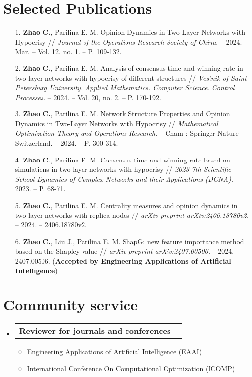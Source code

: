 \documentclass[letterpaper,10pt]{article}
\makeatletter
\newcommand{\resumeItem}[1]{
  \item\small{
    {#1 \vspace{-2pt}}
  }
}
\newcommand{\resumeProjectHeading}[2]{
  \item
  \begin{tabular*}{0.97\textwidth}{l@{\extracolsep{\fill}}r}
    \small#1 & #2 \\
  \end{tabular*}\vspace{-7pt}
}
\newenvironment{resumeSubHeadingList}{\begin{itemize}[leftmargin=0.15in, label={}]}{\end{itemize}}
\newenvironment{resumeItemList}{\begin{itemize}}{\end{itemize}}
\makeatother
\begin{document}
\section{Selected Publications}
\begin{enumerate}
    \fontsize{10}{10.5}\selectfont
    \item [1.] \textbf{Zhao C.}, Parilina E. M. Opinion Dynamics in Two-Layer Networks with Hypocrisy // {\it Journal of the Operations Research Society of China}. -- 2024. -- Mar. -- Vol. 12, no. 1. -- P. 109-132.
    \item [2.] \textbf{Zhao C.}, Parilina E. M. Analysis of consensus time and winning rate in two-layer networks with hypocrisy of different structures // {\it Vestnik of Saint Petersburg University. Applied Mathematics. Computer Science. Control Processes.} -- 2024. -- Vol. 20, no. 2. -- P. 170-192.
    \item [3.] \textbf{Zhao C.}, Parilina E. M. Network Structure Properties and Opinion Dynamics in Two-Layer Networks with Hypocrisy // {\it Mathematical Optimization Theory and Operations Research}. -- Cham : Springer Nature Switzerland. -- 2024. -- P. 300-314.
    \item [4.] \textbf{Zhao C.}, Parilina E. M. Consensus time and winning rate based on simulations in two-layer networks with hypocrisy // {\it 2023 7th Scientific School Dynamics of Complex Networks and their Applications (DCNA).} -- 2023. -- P. 68-71.
    \item [5.] \textbf{Zhao C.}, Parilina E. M. Centrality measures and opinion dynamics in two-layer networks with replica nodes // {\it arXiv preprint arXiv:2406.18780v2.} -- 2024. -- 2406.18780v2.
    \item [6.] \textbf{Zhao C.}, Liu J., Parilina E. M. ShapG: new feature importance method based on the Shapley value // {\it arXiv preprint arXiv:2407.00506.} -- 2024. -- 2407.00506. ({\bf Accepted by Engineering Applications of Artificial Intelligence})
\end{enumerate}

\section{Community service}
\begin{resumeSubHeadingList}
\resumeProjectHeading{{\bf Reviewer for journals and conferences}}{}
\begin{resumeItemList}
    \resumeItem{Engineering Applications of Artificial Intelligence (EAAI)}
    \resumeItem{International Conference On Computational Optimization (ICOMP)}
  \end{resumeItemList}
\end{resumeSubHeadingList}
\end{document}
